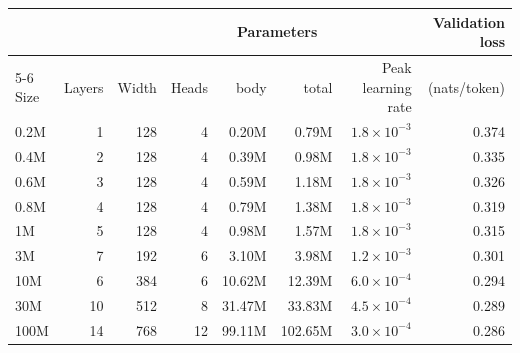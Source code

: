 \begin{tabular}{lrrrrrrr}
\toprule
 & & & & \multicolumn{2}{c}{Parameters} & & Validation loss \\
\cmidrule(lr){5-6}
Size & Layers & Width & Heads & body & total & Peak learning rate & (nats/token) \\
\midrule
0.2M & 1 & 128 & 4 & 0.20M & 0.79M & $1.8\times10^{-3}$ & 0.374 \\
0.4M & 2 & 128 & 4 & 0.39M & 0.98M & $1.8\times10^{-3}$ & 0.335 \\
0.6M & 3 & 128 & 4 & 0.59M & 1.18M & $1.8\times10^{-3}$ & 0.326 \\
0.8M & 4 & 128 & 4 & 0.79M & 1.38M & $1.8\times10^{-3}$ & 0.319 \\
\midrule
1M & 5 & 128 & 4 & 0.98M & 1.57M & $1.8\times10^{-3}$ & 0.315 \\
3M & 7 & 192 & 6 & 3.10M & 3.98M & $1.2\times10^{-3}$ & 0.301 \\
10M & 6 & 384 & 6 & 10.62M & 12.39M & $6.0\times10^{-4}$ & 0.294 \\
30M & 10 & 512 & 8 & 31.47M & 33.83M & $4.5\times10^{-4}$ & 0.289 \\
100M & 14 & 768 & 12 & 99.11M & 102.65M & $3.0\times10^{-4}$ & 0.286 \\
\bottomrule
\end{tabular}

